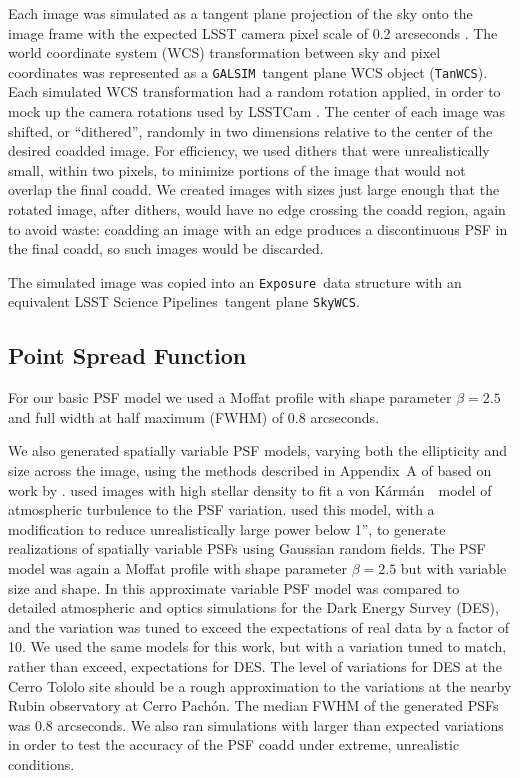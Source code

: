 \documentclass[twocolumn,twocolappendix,astrosym]{openjournal}
\newcommand{\galsim}{\texttt{GALSIM}}
\newcommand{\calexp}{\texttt{Exposure}}
\newcommand{\dm}{LSST Science Pipelines}
\newcommand{\vonkarman}{{von K\'arm\'an}~}
\begin{document}
Each image was simulated as a tangent plane projection of the sky onto the
image frame with the expected LSST camera pixel scale of 0.2 arcseconds
\citep{IvezicLSST2008}.  The world coordinate system (WCS) transformation between
sky and pixel coordinates was represented as a \galsim\ tangent plane 
WCS object (\texttt{TanWCS}).
Each simulated WCS transformation had a random rotation applied, in order to
mock up the camera rotations used by LSSTCam \citep{IvezicLSST2008}.  The
center of each image was shifted, or ``dithered'', randomly in two dimensions
relative to the center of the desired coadded image.  For efficiency, we used
dithers that were unrealistically small, within two pixels, to minimize portions of the
image that would not overlap the final coadd.  We created images with sizes just
large enough that the rotated image, after dithers, would have no edge
crossing the coadd region, again to avoid waste:  coadding an image with an
edge produces a discontinuous PSF in the final coadd, so such images would be
discarded.

The simulated image was copied into an \calexp\ data structure with an
equivalent \dm\ tangent plane \texttt{SkyWCS}.

\subsection{Point Spread Function} \label{sec:sim:psfs}

For our basic PSF model we used a Moffat profile \citep{Moffat1969} with shape
parameter $\beta=2.5$ and full width at half maximum (FWHM) of 0.8 arcseconds.

We also generated spatially variable PSF models, varying both the ellipticity
and size across the image, using the methods described in Appendix~A of
\citet{mdet20} based on work by \citet{heymans2012}.  \citet{heymans2012} used
images with high stellar density to fit a \vonkarman\ model of atmospheric
turbulence to the PSF variation. \citet{mdet20} used this model, with a
modification to reduce unrealistically large power below 1'', to generate
realizations of spatially variable PSFs using Gaussian random fields. The PSF
model was again a Moffat profile with shape parameter $\beta=2.5$ but with
variable size and shape. In \citet{mdet20} this approximate variable PSF model
was compared to detailed atmospheric and optics simulations for the Dark Energy
Survey (DES), and the variation was tuned to exceed the expectations of real
data by a factor of 10.  We used the same models for this work, but with a
variation tuned to match, rather than exceed, expectations for DES.  The level
of variations for DES at the Cerro Tololo site should be a rough approximation
to the variations at the nearby Rubin observatory at Cerro Pachón.  The median
FWHM of the generated PSFs was 0.8 arcseconds.  We also ran simulations with
larger than expected variations in order to test the accuracy of the PSF coadd
under extreme, unrealistic conditions.
\end{document}
